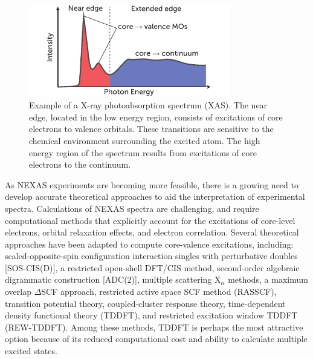 \documentclass{article}
\begin{document}
\begin{figure}[!b]
\centering
\includegraphics[width=8.8cm]{NEXASIllustration.pdf}
\caption{Example of a X-ray photoabsorption spectrum (XAS).  The near edge, located in the low energy region, consists of excitations of core electrons to valence orbitals.  These transitions are sensitive to the chemical environment surrounding the excited atom.  The high energy region of the spectrum results from excitations of core electrons to the continuum.}
\label{fig:nexas-illustration}
\end{figure}

As NEXAS experiments are becoming more feasible, there is a growing need to develop accurate theoretical approaches to aid the interpretation of experimental spectra.
Calculations of NEXAS spectra are challenging, and require computational methods that explicitly account for the excitations of core-level electrons, orbital relaxation effects, and electron correlation. \cite{coriani_coupled-cluster_2012} Several theoretical approaches have been adapted to compute core-valence excitations, including: scaled-opposite-spin configuration interaction singles with perturbative doubles [SOS-CIS(D)],\cite{asmuruf_calculation_2008} a restricted open-shell DFT/CIS method,\cite{roemelt_excited_2013,roemelt_combined_2013} second-order algebraic digrammatic construction [ADC(2)],\cite{schirmer_beyond_1982,trofimov_efficient_1995} multiple scattering X$_\alpha$ methods, \cite{sheehy_correlation_1989} a maximum overlap $\Delta$SCF approach, \cite{besley_self-consistent-field_2009} restricted active space SCF method (RASSCF), \cite{agren_relaxation_1993} transition potential theory,\cite{triguero_calculations_1998} coupled-cluster response theory, \cite{coriani_coupled-cluster_2012} time-dependent density functional theory (TDDFT),\cite{stener_time_2003} and restricted excitation window TDDFT (REW-TDDFT). \cite{lopata_linear-response_2012} Among these methods, TDDFT is perhaps the most attractive option because of its reduced computational cost and ability to calculate multiple excited states.
\end{document}
